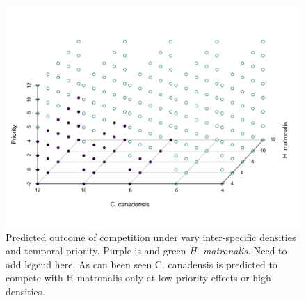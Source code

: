 \documentclass{article}\usepackage[]{graphicx}\usepackage[]{color}
\begin{document}
\begin{figure}[h!]
    \centering
\includegraphics[width=\textwidth]{..//figure/threedpred.jpeg}
    \caption{Predicted outcome of competition under vary inter-specific densities and temporal priority. Purple is  and green \textit{H. matronalis}. Need to add legend here. As can been seen C. canadensis is predicted to compete with H matronalis only at low priority effects or high densities. } 
    \label{fig:Hm}
\end{figure}
\end{document}
